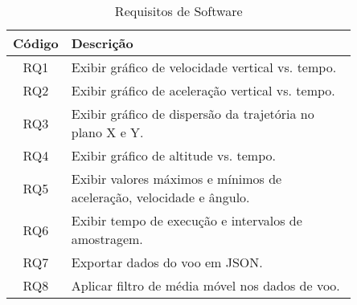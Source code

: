 \begin{table}[H]
\centering
\scriptsize %
\setlength{\tabcolsep}{4pt} %
\caption{Requisitos de Software} %
\begin{tabular}{|c|p{0.85\linewidth}|}
\hline
\textbf{Código} & \textbf{Descrição} \\
\hline
RQ1 & Exibir gráfico de velocidade vertical vs. tempo. \\
\hline
RQ2 & Exibir gráfico de aceleração vertical vs. tempo. \\
\hline
RQ3 & Exibir gráfico de dispersão da trajetória no plano X e Y. \\
\hline
RQ4 & Exibir gráfico de altitude vs. tempo. \\
\hline
RQ5 & Exibir valores máximos e mínimos de aceleração, velocidade e ângulo. \\
\hline
RQ6 & Exibir tempo de execução e intervalos de amostragem. \\
\hline
RQ7 & Exportar dados do voo em JSON. \\
\hline
RQ8 & Aplicar filtro de média móvel nos dados de voo. \\
\hline
\end{tabular}
\label{tab:requisitos_detalhados} %
\end{table}


